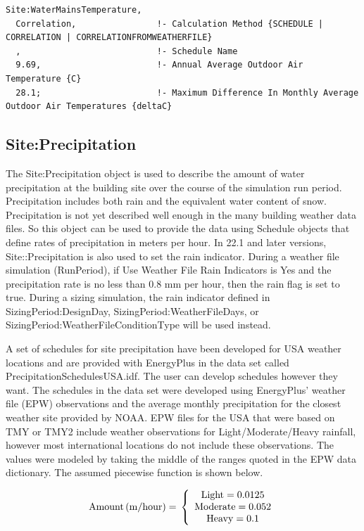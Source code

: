\begin{lstlisting}
Site:WaterMainsTemperature,
  Correlation,                !- Calculation Method {SCHEDULE | CORRELATION | CORRELATIONFROMWEATHERFILE}
  ,                           !- Schedule Name
  9.69,                       !- Annual Average Outdoor Air Temperature {C}
  28.1;                       !- Maximum Difference In Monthly Average Outdoor Air Temperatures {deltaC}
\end{lstlisting}

\subsection{Site:Precipitation}\label{siteprecipitation}

The Site:Precipitation object is used to describe the amount of water
precipitation at the building site over the course of the simulation run period.
Precipitation includes both rain and the equivalent water content of snow.
Precipitation is not yet described well enough in the many building weather data
files. So this object can be used to provide the data using Schedule objects
that define rates of precipitation in meters per hour. In 22.1 and later
versions, Site::Precipitation is also used to set the rain indicator. During a
weather file simulation (RunPeriod), if Use Weather File Rain Indicators is Yes
and the precipitation rate is no less than 0.8 mm per hour, then the rain flag
is set to true. During a sizing simulation, the rain indicator defined in
SizingPeriod:DesignDay, SizingPeriod:WeatherFileDays, or
SizingPeriod:WeatherFileConditionType will be used instead.

A set of schedules for site precipitation have been developed for USA weather locations and are provided with EnergyPlus in the data set called PrecipitationSchedulesUSA.idf. The user can develop schedules however they want. The schedules in the data set were developed using EnergyPlus' weather file (EPW) observations and the average monthly precipitation for the closest weather site provided by NOAA. EPW files for the USA that were based on TMY or TMY2 include weather observations for Light/Moderate/Heavy rainfall, however most international locations do not include these observations. The values were modeled by taking the middle of the ranges quoted in the EPW data dictionary. The assumed piecewise function is shown below.

\begin{equation}
\rm{Amount} \, (m/hour) = \, \left\{
  \begin{array}{*{20}{c}}
    \rm{Light} = 0.0125 \\
    \rm{Moderate} = 0.052 \\
    \rm{Heavy} = 0.1
  \end{array}
\right.
\end{equation}

